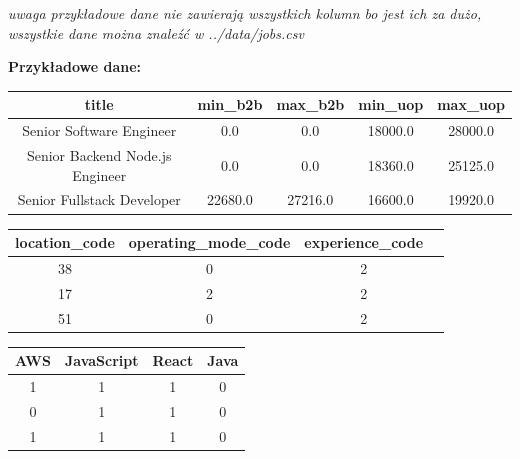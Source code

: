 \documentclass[a4paper]{article}
\begin{document}
\textit{uwaga przykładowe dane nie zawierają wszystkich kolumn bo jest ich za dużo, wszystkie dane można znaleźć w ../data/jobs.csv}


\textbf{Przykładowe dane:}


\begin{table}[h]
    \centering
    \begin{tabular}{|c|c|c|c|c|}
        \hline
        \multicolumn{1}{|c|}{\textbf{title}} & \textbf{min\_b2b} & \textbf{max\_b2b} & \textbf{min\_uop} & \textbf{max\_uop} \\ \hline
        Senior Software Engineer             & 0.0               & 0.0               & 18000.0           & 28000.0           \\ \hline
        Senior Backend Node.js Engineer      & 0.0               & 0.0               & 18360.0           & 25125.0           \\ \hline
        Senior Fullstack Developer           & 22680.0           & 27216.0           & 16600.0           & 19920.0           \\ \hline
    \end{tabular}
\end{table}


\begin{table}[h]
    \centering
    \begin{tabular}{|c|c|c|c|}
        \hline
        \textbf{location\_code} & \textbf{operating\_mode\_code} & \textbf{experience\_code} \\ \hline
        38                      & 0                              & 2                         \\ \hline
        17                      & 2                              & 2                         \\ \hline
        51                      & 0                              & 2                         \\ \hline
    \end{tabular}
\end{table}


\begin{table}[h]
    \centering
    \begin{tabular}{|c|c|c|c|}
        \hline
        \textbf{AWS} & \textbf{JavaScript} & \textbf{React} & \textbf{Java} \\ \hline
        1            & 1                   & 1              & 0             \\ \hline
        0            & 1                   & 1              & 0             \\ \hline
        1            & 1                   & 1              & 0             \\ \hline
    \end{tabular}
\end{table}
\end{document}
